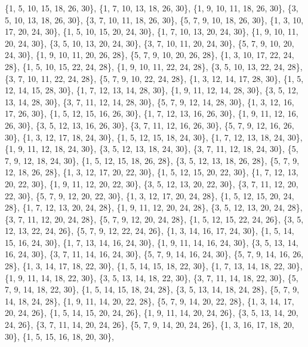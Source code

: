 \documentclass[11pt,a4paper]{article}
\begin{document}
{\{1, 5, 10, 15, 18, 26, 30\}, \{1, 7, 10, 13, 18, 26, 30\}, \{1, 9, 10, 11, 18, 26, 30\}, \{3, 5, 10, 13, 18, 26, 30\}, \{3, 7, 10, 11, 18, 26, 30\},
\{5, 7, 9, 10, 18, 26, 30\}, \{1, 3, 10, 17, 20, 24, 30\}, \{1, 5, 10, 15, 20, 24, 30\}, \{1, 7, 10, 13, 20, 24, 30\}, \{1, 9, 10, 11, 20, 24, 30\},
\{3, 5, 10, 13, 20, 24, 30\}, \{3, 7, 10, 11, 20, 24, 30\}, \{5, 7, 9, 10, 20, 24, 30\}, \{1, 9, 10, 11, 20, 26, 28\}, \{5, 7, 9, 10, 20, 26, 28\},
\{1, 3, 10, 17, 22, 24, 28\}, \{1, 5, 10, 15, 22, 24, 28\}, \{1, 9, 10, 11, 22, 24, 28\}, \{3, 5, 10, 13, 22, 24, 28\}, \{3, 7, 10, 11, 22, 24, 28\},
\{5, 7, 9, 10, 22, 24, 28\}, \{1, 3, 12, 14, 17, 28, 30\}, \{1, 5, 12, 14, 15, 28, 30\}, \{1, 7, 12, 13, 14, 28, 30\}, \{1, 9, 11, 12, 14, 28, 30\},
\{3, 5, 12, 13, 14, 28, 30\}, \{3, 7, 11, 12, 14, 28, 30\}, \{5, 7, 9, 12, 14, 28, 30\}, \{1, 3, 12, 16, 17, 26, 30\}, \{1, 5, 12, 15, 16, 26, 30\},
\{1, 7, 12, 13, 16, 26, 30\}, \{1, 9, 11, 12, 16, 26, 30\}, \{3, 5, 12, 13, 16, 26, 30\}, \{3, 7, 11, 12, 16, 26, 30\}, \{5, 7, 9, 12, 16, 26, 30\},
\{1, 3, 12, 17, 18, 24, 30\}, \{1, 5, 12, 15, 18, 24, 30\}, \{1, 7, 12, 13, 18, 24, 30\}, \{1, 9, 11, 12, 18, 24, 30\}, \{3, 5, 12, 13, 18, 24, 30\},
\{3, 7, 11, 12, 18, 24, 30\}, \{5, 7, 9, 12, 18, 24, 30\}, \{1, 5, 12, 15, 18, 26, 28\}, \{3, 5, 12, 13, 18, 26, 28\}, \{5, 7, 9, 12, 18, 26, 28\},
\{1, 3, 12, 17, 20, 22, 30\}, \{1, 5, 12, 15, 20, 22, 30\}, \{1, 7, 12, 13, 20, 22, 30\}, \{1, 9, 11, 12, 20, 22, 30\}, \{3, 5, 12, 13, 20, 22, 30\},
\{3, 7, 11, 12, 20, 22, 30\}, \{5, 7, 9, 12, 20, 22, 30\}, \{1, 3, 12, 17, 20, 24, 28\}, \{1, 5, 12, 15, 20, 24, 28\}, \{1, 7, 12, 13, 20, 24, 28\},
\{1, 9, 11, 12, 20, 24, 28\}, \{3, 5, 12, 13, 20, 24, 28\}, \{3, 7, 11, 12, 20, 24, 28\}, \{5, 7, 9, 12, 20, 24, 28\}, \{1, 5, 12, 15, 22, 24, 26\},
\{3, 5, 12, 13, 22, 24, 26\}, \{5, 7, 9, 12, 22, 24, 26\}, \{1, 3, 14, 16, 17, 24, 30\}, \{1, 5, 14, 15, 16, 24, 30\}, \{1, 7, 13, 14, 16, 24, 30\},
\{1, 9, 11, 14, 16, 24, 30\}, \{3, 5, 13, 14, 16, 24, 30\}, \{3, 7, 11, 14, 16, 24, 30\}, \{5, 7, 9, 14, 16, 24, 30\}, \{5, 7, 9, 14, 16, 26, 28\},
\{1, 3, 14, 17, 18, 22, 30\}, \{1, 5, 14, 15, 18, 22, 30\}, \{1, 7, 13, 14, 18, 22, 30\}, \{1, 9, 11, 14, 18, 22, 30\}, \{3, 5, 13, 14, 18, 22, 30\},
\{3, 7, 11, 14, 18, 22, 30\}, \{5, 7, 9, 14, 18, 22, 30\}, \{1, 5, 14, 15, 18, 24, 28\}, \{3, 5, 13, 14, 18, 24, 28\}, \{5, 7, 9, 14, 18, 24, 28\},
\{1, 9, 11, 14, 20, 22, 28\}, \{5, 7, 9, 14, 20, 22, 28\}, \{1, 3, 14, 17, 20, 24, 26\}, \{1, 5, 14, 15, 20, 24, 26\}, \{1, 9, 11, 14, 20, 24, 26\},
\{3, 5, 13, 14, 20, 24, 26\}, \{3, 7, 11, 14, 20, 24, 26\}, \{5, 7, 9, 14, 20, 24, 26\}, \{1, 3, 16, 17, 18, 20, 30\}, \{1, 5, 15, 16, 18, 20, 30\},
}
\end{document}
